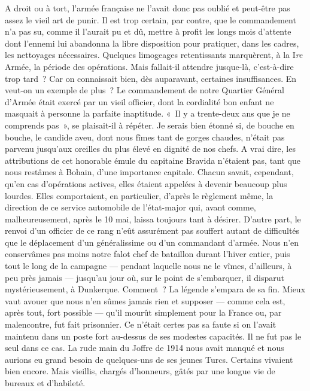 \documentclass[french,twoside]{book} %
\begin{document}
A droit ou à tort, l’armée française ne l’avait donc pas oublié et peut-être pas assez le vieil art de punir. Il est trop certain, par contre, que le commandement n’a pas su, comme il l’aurait pu et dû, mettre à profit les longs mois d’attente dont l’ennemi lui abandonna la libre disposition pour pratiquer, dans les cadres, les nettoyages nécessaires. Quelques limogeages retentissants marquèrent, à la I\emph{re} Armée, la période des opérations. Mais fallait-il attendre jusque-là, c’est-à-dire trop tard ? Car on connaissait bien, dès auparavant, certaines insuffisances. En veut-on un exemple de plus ? Le commandement de notre Quartier Général d’Armée était exercé par un vieil officier, dont la cordialité bon enfant ne masquait à personne la parfaite inaptitude. « Il y a trente-deux ans que je ne comprends pas », se plaisait-il à répéter. Je serais bien étonné si, de bouche en bouche, le candide aveu, dont nous fîmes tant de gorges chaudes, n’était pas parvenu jusqu’aux oreilles du plus élevé en dignité de nos chefs. A vrai dire, les attributions de cet honorable émule du   capitaine Bravida n’étaient pas, tant que nous restâmes à Bohain, d’une importance capitale. Chacun savait, cependant, qu’en cas d’opérations actives, elles étaient appelées à devenir beaucoup plus lourdes. Elles comportaient, en particulier, d’après le règlement même, la direction de ce service automobile de l’état-major qui, avant comme, malheureusement, après le 10 mai, laissa toujours tant à désirer. D’autre part, le renvoi d’un officier de ce rang n’eût assurément pas souffert autant de difficultés que le déplacement d’un généralissime ou d’un commandant d’armée. Nous n’en conservâmes pas moins notre falot chef de bataillon durant l’hiver entier, puis tout le long de la campagne — pendant laquelle nous ne le vîmes, d’ailleurs, à peu près jamais — jusqu’au jour où, sur le point de s’embarquer, il disparut mystérieusement, à Dunkerque. Comment ? La légende s’empara de sa fin. Mieux vaut avouer que nous n’en sûmes jamais rien et supposer — comme cela est, après tout, fort possible — qu’il mourût simplement pour la France ou, par malencontre, fut fait prisonnier. Ce n’était certes pas sa faute si on l’avait maintenu dans un poste fort au-dessus de ses modestes capacités. Il ne fut pas le seul dans ce cas. La rude main du Joffre de 1914 nous avait manqué et nous aurions eu grand besoin de quelques-uns de ses jeunes Turcs. Certains vivaient bien encore. Mais vieillis, chargés d’honneurs, gâtés par une longue vie de bureaux et d’habileté.\par
\end{document}
